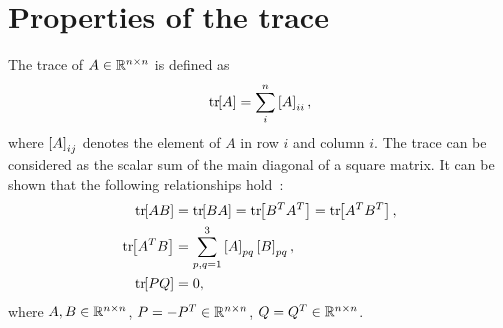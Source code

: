 
\chapter{Properties of the trace}\label{chap:trace}

The trace of \( A \in \mathbb{R}^{n \times n} \) is defined as
\begin{align}
    \mathrm{tr}\negthickspace\left[ A \right] = \sum_i^n \left[ A \right]_{ii},
\end{align}
where \( \left[ A \right]_{ij} \) denotes the element of \( A \) in row \( i \) and column \( i \).
The trace can be considered as the scalar sum of the main diagonal of a square matrix.
It can be shown that the following relationships hold~\cite{petersen2008,strang2008}:
\begin{align}
    \mathrm{tr}\negthickspace\left[ A B \right] &= \mathrm{tr}\negthickspace\left[ B A \right] = \mathrm{tr}\negthickspace\left[ B^T A^T \right] = \mathrm{tr}\negthickspace\left[ A^T B^T \right], \label{eq:trAB} \\
    \mathrm{tr}\negthickspace\left[ A^T B  \right] &= \sum_{p, q=1}^3 \left[ A \right]_{pq} \left[ B \right]_{pq}, \label{eq:trATB} \\
   \mathrm{tr}\negthickspace\left[ PQ \right] &= 0, \label{eq:trPQ}
\end{align}
where \( A, B \in \mathbb{R}^{n \times n} \), \( P = -P^T \in \mathbb{R}^{n\times n} \), \( Q = Q^T \in \mathbb{R}^{n \times n} \).
